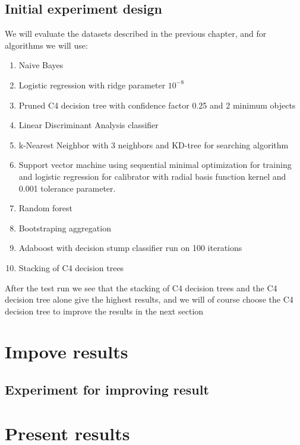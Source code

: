 \section{Initial experiment design}
We will evaluate the datasets described in the previous chapter, and for algorithms we will use:
\begin{enumerate}
    \item Naive Bayes
    \item Logistic regression with ridge parameter $10^{-8}$
    \item Pruned C4 decision tree with confidence factor 0.25 and 2 minimum objects
    \item Linear Discriminant Analysis classifier
    \item k-Nearest Neighbor with 3 neighbors and KD-tree for searching algorithm
    \item Support vector machine using sequential minimal optimization for training and logistic regression for calibrator with radial basis function kernel and 0.001 tolerance parameter.
    \item Random forest
    \item Bootstraping aggregation
    \item Adaboost with decision stump classifier run on 100 iterations
    \item Stacking of C4 decision trees
\end{enumerate}
After the test run we see \cite{repo} that the stacking of C4 decision trees and the C4 decision tree alone give the highest results, and we will of course choose the C4 decision tree to improve the results in the next section

\chapter{Impove results}
\section{Experiment for improving result}

\chapter{Present results}